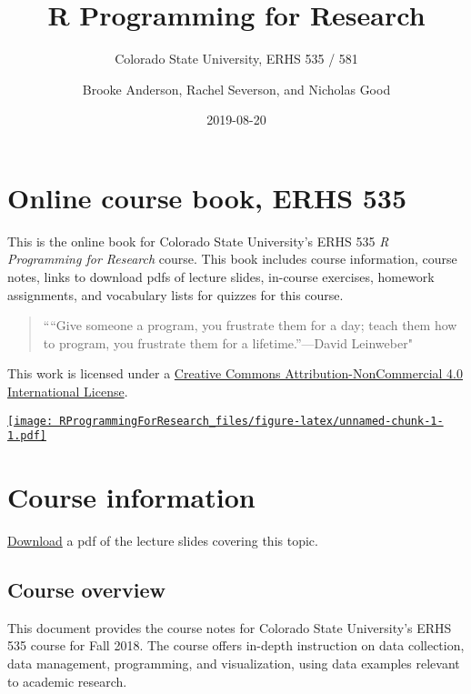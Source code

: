 \documentclass[]{book}
\title{R Programming for Research}
\subtitle{Colorado State University, ERHS 535 / 581}
\author{Brooke Anderson, Rachel Severson, and Nicholas Good}
\date{2019-08-20}
\begin{document}
\maketitle

{
\setcounter{tocdepth}{1}
\tableofcontents
}
\hypertarget{online-course-book-erhs-535}{%
\chapter*{Online course book, ERHS 535}\label{online-course-book-erhs-535}}

This is the online book for Colorado State University's ERHS 535 \emph{R Programming for Research} course. This book includes course information, course notes, links to download pdfs of lecture slides, in-course exercises, homework assignments, and vocabulary lists for quizzes for this course.

\begin{quote}
````Give someone a program, you frustrate them for a day; teach them how to program, you frustrate them for a lifetime.''---David Leinweber"
\end{quote}

This work is licensed under a \href{https://creativecommons.org/licenses/by-nc/4.0/}{Creative Commons Attribution-NonCommercial 4.0 International License}.

\href{https://brookeanderson.shinyapps.io/attendance/}{\texttt{[image: RProgrammingForResearch\_files/figure-latex/unnamed-chunk-1-1.pdf]}}

\mainmatter

\hypertarget{course-information}{%
\chapter*{Course information}\label{course-information}}

\href{https://github.com/geanders/RProgrammingForResearch/raw/master/slides/CourseOverview.pdf}{Download} a pdf of the lecture slides covering this topic.

\hypertarget{course-overview}{%
\section{Course overview}\label{course-overview}}

This document provides the course notes for Colorado State University's ERHS 535 course for Fall 2018. The course offers in-depth instruction on data collection, data management, programming, and visualization, using data examples relevant to academic research.
\end{document}
